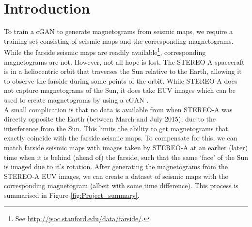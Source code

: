\documentclass[11pt,a4paper,onecolumn]{report}
\begin{document}
%
%
%
%
\chapter{Introduction}
%
%
%
%





%
%

To train a cGAN to generate magnetograms from seismic maps, we require a
training set consisting of seismic maps and the corresponding magnetograms.
While the farside seismic maps are readily available\footnote{See
  \url{http://jsoc.stanford.edu/data/farside/}.}, corresponding magnetograms are
not. However, not all hope is lost. The STEREO-A spacecraft is in a heliocentric
orbit that traverses the Sun relative to the Earth, allowing it to observe the
farside during some points of the orbit. While STEREO-A does not capture
magnetograms of the Sun, it does take EUV images which can be used to create
magnetograms by using a cGAN \citep{Kim2019}.\\

A small complication is that no data is available from when STEREO-A was
directly opposite the Earth (between March and July 2015), due to the
interference from the Sun. This limits the ability to get magnetograms that
exactly coincide with the farside seismic maps. To compensate for this, we can
match farside seismic maps with images taken by STEREO-A at an earlier (later)
time when it is behind (ahead of) the farside, such that the same `face' of the
Sun is imaged due to it's rotation. After generating the magnetograms from the
STEREO-A EUV images, we can create a dataset of seismic maps with the
corresponding magnetogram (albeit with some time difference). This process is
summarised in Figure \ref{fig:Project_summary}.\\
\end{document}
